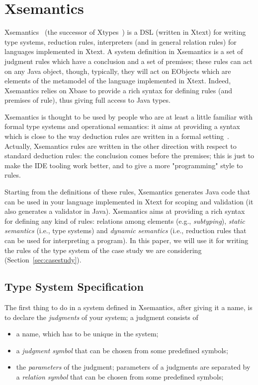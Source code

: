 \section{Xsemantics}
\label{sec:xsemantics}

Xsemantics~\cite{lbts} (the successor of Xtypes~\cite{Bet11}) is a DSL (written
in Xtext) for writing type systems, reduction rules, interpreters (and in
general relation rules) for languages implemented in Xtext.
A system definition in Xsemantics is a set of judgment rules which have a
conclusion and a set of premises; these rules can act on any Java object,
though, typically, they will act on EObjects which are elements of the metamodel
of the language implemented in Xtext.  Indeed, Xsemantics relies on Xbase to
provide a rich syntax for defining rules (and premises of rule), thus giving
full access to Java types.

Xsemantics is thought to be used by people who are at least a little familiar
with formal type systems and operational semantics: it aims at providing
a syntax which is close to the way deduction rules are written in a formal
setting~\cite{hindley:1997a,Pierce02}.
Actually, Xsemantics rules are written in the other direction with respect
to standard deduction rules: the conclusion comes before the premises; this is
just to make the IDE tooling work better, and to give a more "programming" style to rules.

Starting from the definitions of these rules, Xsemantics generates Java code
that can be used in your language implemented in Xtext for scoping and
validation (it also generates a validator in Java).  Xsemantics aims at
providing a rich syntax for defining any kind of rules: relations among elements
(e.g., \emph{subtyping}), \emph{static semantics} (i.e., type systems) and
\emph{dynamic semantics} (i.e., reduction rules that can be used for
interpreting a program).  In this paper, we will use it for writing the rules of
the type system of the case study we are considering
(Section~\ref{sec:casestudy}).

\subsection{Type System Specification}

The first thing to do in a system defined in Xsemantics, after giving it a name,
is to declare the \emph{judgments} of your system; a judgment consists of

\begin{itemize}
\item 
a name, which has to be unique in the system;
\item 
a \textit{judgment symbol} that can be chosen from some predefined symbols;
\item 
the \textit{parameters} of the judgment; parameters of a judgments are separated by
	a \textit{relation symbol} that can be chosen from some predefined symbols;
\end{itemize}

